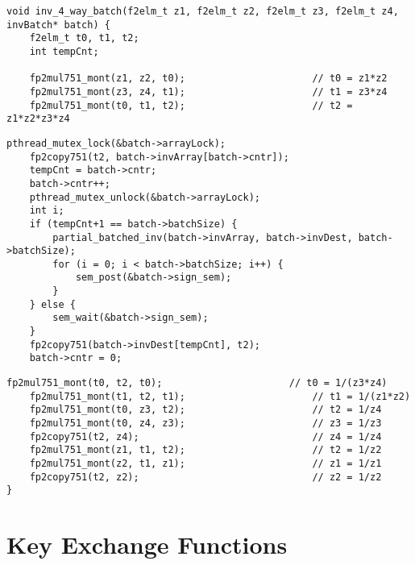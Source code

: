 \begin{lstlisting}
void inv_4_way_batch(f2elm_t z1, f2elm_t z2, f2elm_t z3, f2elm_t z4, invBatch* batch) {
  	f2elm_t t0, t1, t2;
	int tempCnt;

    fp2mul751_mont(z1, z2, t0);                      // t0 = z1*z2
    fp2mul751_mont(z3, z4, t1);                      // t1 = z3*z4
    fp2mul751_mont(t0, t1, t2);                      // t2 = z1*z2*z3*z4
\end{lstlisting}
\vspace{-\baselineskip}
\begin{lstlisting}[backgroundcolor = \color{light-green}, firstnumber=8]
	pthread_mutex_lock(&batch->arrayLock);
	fp2copy751(t2, batch->invArray[batch->cntr]);
	tempCnt = batch->cntr;
	batch->cntr++; 
	pthread_mutex_unlock(&batch->arrayLock);
	int i;		
	if (tempCnt+1 == batch->batchSize) {
		partial_batched_inv(batch->invArray, batch->invDest, batch->batchSize);
		for (i = 0; i < batch->batchSize; i++) {
			sem_post(&batch->sign_sem);			
		}
	} else {
		sem_wait(&batch->sign_sem);
	}
	fp2copy751(batch->invDest[tempCnt], t2);
	batch->cntr = 0;
\end{lstlisting}
\vspace{-\baselineskip}
\begin{lstlisting}[firstnumber=24]
    fp2mul751_mont(t0, t2, t0);                      // t0 = 1/(z3*z4) 
    fp2mul751_mont(t1, t2, t1);                      // t1 = 1/(z1*z2) 
    fp2mul751_mont(t0, z3, t2);                      // t2 = 1/z4
    fp2mul751_mont(t0, z4, z3);                      // z3 = 1/z3
    fp2copy751(t2, z4);                              // z4 = 1/z4
    fp2mul751_mont(z1, t1, t2);                      // t2 = 1/z2
    fp2mul751_mont(z2, t1, z1);                      // z1 = 1/z1
    fp2copy751(t2, z2);                              // z2 = 1/z2
}
\end{lstlisting}

\section{Key Exchange Functions}

